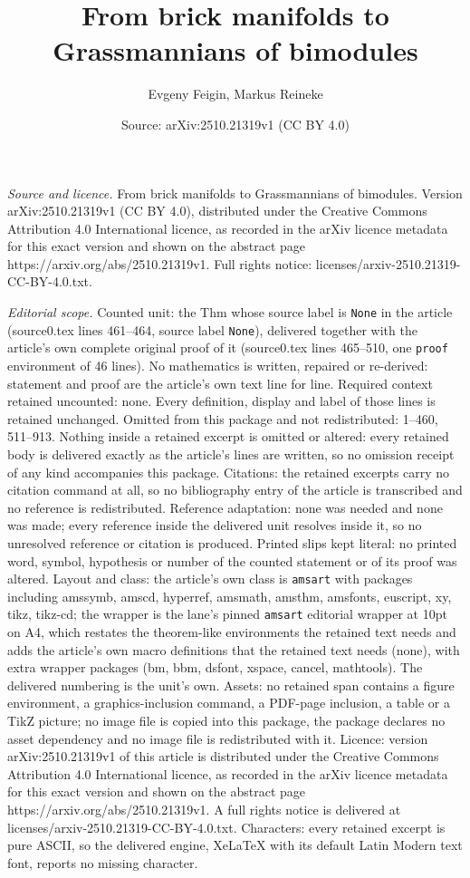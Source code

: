 \documentclass[10pt,a4paper]{amsart}
\title[From brick manifolds to Grassmannians of bimodules]{From brick manifolds to Grassmannians of bimodules}
\author{Evgeny Feigin, Markus Reineke}
\date{Source: arXiv:2510.21319v1 (CC BY 4.0)}
\begin{document}
\maketitle

\noindent\emph{Source and licence.} From brick manifolds to Grassmannians of bimodules. Version arXiv:2510.21319v1 (CC BY 4.0), distributed under the Creative Commons Attribution 4.0 International licence, as recorded in the arXiv licence metadata for this exact version and shown on the abstract page https://arxiv.org/abs/2510.21319v1. Full rights notice: licenses/arxiv-2510.21319-CC-BY-4.0.txt.\par\smallskip

\noindent\textit{Editorial scope.} Counted unit: the Thm whose source label is \texttt{None} in the article (source0.tex lines 461--464, source label \texttt{None}), delivered together with the article's own complete original proof of it (source0.tex lines 465--510, one \texttt{proof} environment of 46 lines). No mathematics is written, repaired or re-derived: statement and proof are the article's own text line for line. Required context retained uncounted: none. Every definition, display and label of those lines is retained unchanged. Omitted from this package and not redistributed: 1--460, 511--913. Nothing inside a retained excerpt is omitted or altered: every retained body is delivered exactly as the article's lines are written, so no omission receipt of any kind accompanies this package. Citations: the retained excerpts carry no citation command at all, so no bibliography entry of the article is transcribed and no reference is redistributed. Reference adaptation: none was needed and none was made; every reference inside the delivered unit resolves inside it, so no unresolved reference or citation is produced. Printed slips kept literal: no printed word, symbol, hypothesis or number of the counted statement or of its proof was altered. Layout and class: the article's own class is \texttt{amsart} with packages including amssymb, amscd, hyperref, amsmath, amsthm, amsfonts, euscript, xy, tikz, tikz-cd; the wrapper is the lane's pinned \texttt{amsart} editorial wrapper at 10pt on A4, which restates the theorem-like environments the retained text needs and adds the article's own macro definitions that the retained text needs (none), with extra wrapper packages (bm, bbm, dsfont, xspace, cancel, mathtools). The delivered numbering is the unit's own. Assets: no retained span contains a figure environment, a graphics-inclusion command, a PDF-page inclusion, a table or a TikZ picture; no image file is copied into this package, the package declares no asset dependency and no image file is redistributed with it. Licence: version arXiv:2510.21319v1 of this article is distributed under the Creative Commons Attribution 4.0 International licence, as recorded in the arXiv licence metadata for this exact version and shown on the abstract page https://arxiv.org/abs/2510.21319v1. A full rights notice is delivered at licenses/arxiv-2510.21319-CC-BY-4.0.txt. Characters: every retained excerpt is pure ASCII, so the delivered engine, XeLaTeX with its default Latin Modern text font, reports no missing character.
\end{document}
